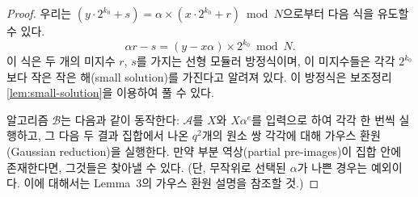 \begin{proof}
    우리는 $(y \cdot 2^{k_0} + s) = \alpha \times (x \cdot 2^{k_0} + r) \bmod
    N$으로부터 다음 식을 유도할 수 있다.
    $$
        \alpha r - s = (y - x\alpha) \times 2^{k_0} \bmod N.
    $$
    이 식은 두 개의 미지수 $r$, $s$를 가지는 선형 모듈러 방정식이며, 이
    미지수들은 각각 $2^{k_0}$보다 작은 작은 해(small solution)를 가진다고 알려져
    있다. 이 방정식은 보조정리 \ref{lem:small-solution}을 이용하여 풀 수 있다.

    알고리즘 $\mathcal{B}$는 다음과 같이 동작한다: $\mathcal{A}$를 $X$와
    $X\alpha^e$를 입력으로 하여 각각 한 번씩 실행하고, 그 다음 두 결과 집합에서
    나온 $q^2$개의 원소 쌍 각각에 대해 가우스 환원(Gaussian reduction)을
    실행한다. 만약 부분 역상(partial pre-images)이 집합 안에 존재한다면,
    그것들은 찾아낼 수 있다. (단, 무작위로 선택된 $\alpha$가 나쁜 경우는
    예외이다. 이에 대해서는 Lemma~3의 가우스 환원 설명을 참조할 것.)
\end{proof}

    